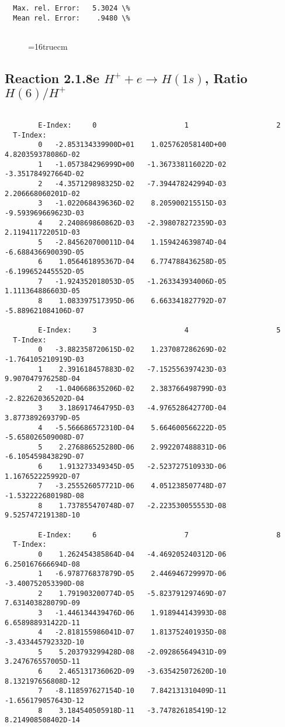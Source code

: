 \documentclass[12pt,dvipdfmx]{article}
\begin{document}
{\begin{small}
\begin{verbatim}
  Max. rel. Error:   5.3024 \%
  Mean rel. Error:    .9480 \%


\end{verbatim}\end{small}
\begin{figure} \label{2.1.8rd}
\epsfxsize=16truecm
\end{figure}
\newpage



\subsection{
Reaction 2.1.8e  $H^+ + e \rightarrow H(1s) $,  Ratio $H(6)/H^+$
}

\begin{small}\begin{verbatim}

        E-Index:     0                     1                     2
  T-Index:
        0   -2.853134339900D+01    1.025762058140D+00    4.820359378086D-02
        1   -1.057384296999D+00   -1.367338116022D-02   -3.351784927664D-02
        2   -4.357129898325D-02   -7.394478242994D-03    2.206668060201D-02
        3   -1.022068439636D-02    8.205900215515D-03   -9.593969669623D-03
        4    2.240869860862D-03   -2.398078272359D-03    2.119411722051D-03
        5   -2.845620700011D-04    1.159424639874D-04   -6.688436690039D-05
        6    1.056461895367D-04    6.774788436258D-05   -6.199652445552D-05
        7   -1.924352018053D-05   -1.263343934006D-05    1.111364886603D-05
        8    1.083397517395D-06    6.663341827792D-07   -5.889621084106D-07

        E-Index:     3                     4                     5
  T-Index:
        0   -3.882358720615D-02    1.237087286269D-02   -1.764105210919D-03
        1    2.391618457883D-02   -7.152556397423D-03    9.907047976258D-04
        2   -1.040668635206D-02    2.383766498799D-03   -2.822620365202D-04
        3    3.186917464795D-03   -4.976528642770D-04    3.877389269379D-05
        4   -5.566686572310D-04    5.664600566222D-05   -5.658026509008D-07
        5    2.276886525280D-06    2.992207488831D-06   -6.105459843829D-07
        6    1.913273349345D-05   -2.523727510933D-06    1.167652225992D-07
        7   -3.255526057721D-06    4.051238507748D-07   -1.532222680198D-08
        8    1.737855470748D-07   -2.223530055553D-08    9.525747219138D-10

        E-Index:     6                     7                     8
  T-Index:
        0    1.262454385864D-04   -4.469205240312D-06    6.250167666694D-08
        1   -6.978776837879D-05    2.446946729997D-06   -3.400752053390D-08
        2    1.791903200774D-05   -5.823791297469D-07    7.631403828079D-09
        3   -1.446134439476D-06    1.918944143993D-08    6.658988931422D-11
        4   -2.818155986041D-07    1.813752401935D-08   -3.433445792332D-10
        5    5.203793299428D-08   -2.092865649431D-09    3.247676557005D-11
        6    2.465131736062D-09   -3.635425072620D-10    8.132197656808D-12
        7   -8.118597627154D-10    7.842131310409D-11   -1.656179057643D-12
        8    3.184540505918D-11   -3.747826185419D-12    8.214908508402D-14


\end{verbatim}
\end{small}}
\end{document}
